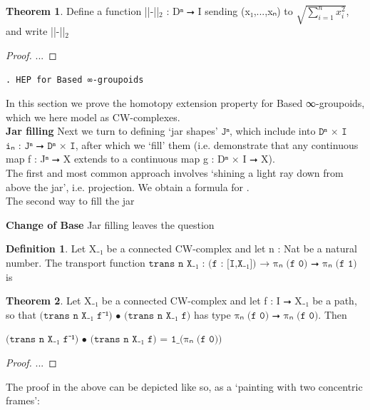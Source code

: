 \documentclass{book}
\theoremstyle{definition}
\newtheorem{definition}{Definition}
\newtheorem{theorem}{Theorem}
\newcounter{pcounter}
\newcounter{sectioncount}
\newcounter{subsectioncount}
\renewcommand{\subsection}[1]{\texttt{\thesubsectioncount . #1} \stepcounter{subsectioncount}}
\begin{document}
\begin{theorem}
Define a function ||-||${}_{2}$ : Dⁿ ⭢ I sending (x₁,...,xₙ) to $\sqrt{\sum_{i = 1}^n x_i^2}$, and write ||-||${}_{2}$
\end{theorem}

\begin{proof}
...
\end{proof}

\subsection{HEP for Based ∞-groupoids}

In this section we prove the homotopy extension property for Based ∞-groupoids, which we here model as CW-complexes.\\


{\bf Jar filling} Next we turn to defining `jar shapes' $\texttt{Jⁿ}$, which include into $\texttt{Dⁿ × I}$ $\texttt{iₙ : Jⁿ ⭢ Dⁿ × I}$, after which we `fill' them (i.e. demonstrate that any continuous map f : Jⁿ ⭢ X extends to a continuous map g : Dⁿ × I ⭢ X).\\

The first and most common approach involves `shining a light ray down from above the jar', i.e. projection. We obtain a formula for .\\

The second way to fill the jar




{\bf Change of Base} Jar filling leaves the question

\begin{definition}
Let X₋₁ be a connected CW-complex and let n : Nat be a natural number. The transport function $\texttt{trans\ n\ X₋₁ : (f : [I,X₋₁])  → πₙ (f 0) ⭢ πₙ (f 1)}$ is 
\end{definition}

\begin{theorem}
Let X₋₁ be a connected CW-complex and let f : I ⭢ X₋₁ be a path, so that $\texttt{(trans\ n X₋₁ f⁻¹) • (trans\ n X₋₁ f)}$ has type $\texttt{πₙ (f 0) ⭢ πₙ (f 0)}$. Then
\begin{center}
$\texttt{(trans\ n X₋₁ f⁻¹) • (trans\ n X₋₁ f) = 1\_(πₙ (f 0))}$
\end{center}
\end{theorem}

\begin{proof}
...
\end{proof}

The proof in the above can be depicted like so, as a `painting with two concentric frames':
\end{document}

